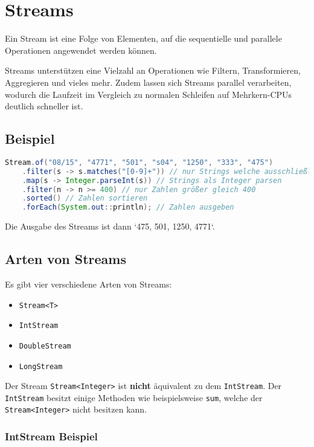 \chapter{Streams}

Ein Stream ist eine Folge von Elementen, auf die sequentielle und parallele Operationen angewendet werden können.

Streams unterstützen eine Vielzahl an Operationen wie Filtern, Transformieren, Aggregieren und vieles mehr. Zudem lassen sich Streams parallel verarbeiten, wodurch die Laufzeit im Vergleich zu normalen Schleifen auf Mehrkern-CPUs deutlich schneller ist.

\section{Beispiel}

\begin{lstlisting}[language=Java, caption={Beispiel für Streams}]
Stream.of("08/15", "4771", "501", "s04", "1250", "333", "475")
    .filter(s -> s.matches("[0-9]+")) // nur Strings welche ausschließlich Ziffern enthalten
    .map(s -> Integer.parseInt(s)) // Strings als Integer parsen
    .filter(n -> n >= 400) // nur Zahlen größer gleich 400
    .sorted() // Zahlen sortieren
    .forEach(System.out::println); // Zahlen ausgeben
\end{lstlisting}

Die Ausgabe des Streams ist dann `475, 501, 1250, 4771`.

\section{Arten von Streams}

Es gibt vier verschiedene Arten von Streams:
\begin{itemize}
    \item \texttt{Stream<T>}
    \item \texttt{IntStream}
    \item \texttt{DoubleStream}
    \item \texttt{LongStream}
\end{itemize}

Der Stream \lstinline{Stream<Integer>} ist \textbf{nicht} äquivalent zu dem \lstinline{IntStream}. Der \lstinline{IntStream} besitzt einige Methoden wie beispielsweise \lstinline{sum}, welche der \lstinline{Stream<Integer>} nicht besitzen kann.

\subsection{IntStream Beispiel}


